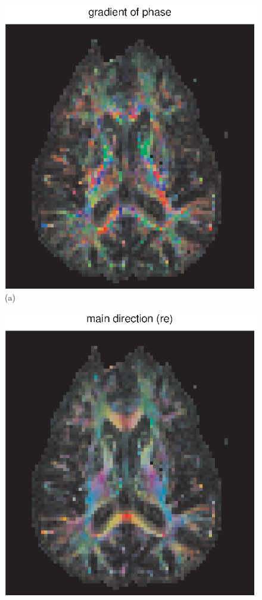 \documentclass[authoryear,preprint,12pt]{elsarticle}
\begin{document}
\begin{figure}[p]
  \begin{center}
   \begin{minipage}[]{.42\textwidth}
      \centering
      \includegraphics[width=\textwidth]{gradphase55a.eps}
      (a)
      \end{minipage}
       \begin{minipage}[]{.42\textwidth}
      \centering
      \includegraphics[width=\textwidth]{tensdir55.eps}

\end{minipage}
\end{center}
\end{figure}
\end{document}
